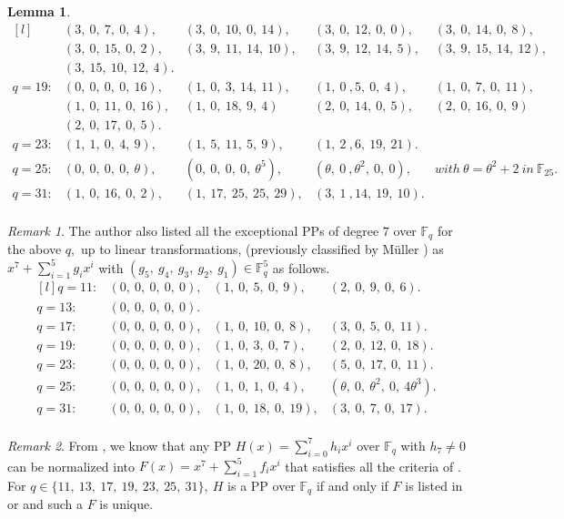 \documentclass[12pt,a4wide, reqno]{amsart}
\newtheorem{lemma}{Lemma}
\theoremstyle{definition}
\theoremstyle{remark}
\newtheorem{remark}{Remark}
\numberwithin{equation}{section}
\begin{document}
\begin{lemma}
\begin{displaymath}
\begin{matrix*}[l]
& (3,~0,~7,~0,~4), &(3,~0,~10,~0,~14),& (3,~0,~12,~0,~0), &(3,~0,~14,~0,~8),\\
& (3,~0,~15,~0,~2), &(3,~9,~11,~14,~10), & (3,~9,~12,~14,~5),& (3,~9,~15,~14,~12),\\
&(3,~15,~10,~12,~4).&  &  & \\
q=19:& (0,~0,~0,~0,~16), &(1,~0,~3,~14,~11), & (1,~0~,5,~0,~4),&(1,~0,~7,~0,~11),\\
& (1,~0,~11,~0,~16),& (1,~0,~18,~9,~4) &(2,~0,~14,~0,~5),  &(2,~0,~16,~0,~9)\\
& (2,~0,~17,~0,~5). & & & \\
q=23:& (1,~1,~0,~4,~9), &(1,~5,~11,~5,~9), & (1,~2~,6,~19,~21).&  \\
q=25:& (0,~0,~0,~0,~\theta), &(0,~0,~0,~0,~\theta^5), & (\theta,~0~,\theta^2,~0,~0),& with~\theta=\theta^2+2~in~ \mathbb{F}_{25}.  \\
q=31:& (1,~0,~16,~0,~2), &(1,~17,~25,~25,~29), & (3,~1~,14,~19,~10).&   \\ 
\end{matrix*}
\end{displaymath}
\end{lemma}
\begin{remark} \label{r1}
    The author also listed  all the exceptional PPs of degree $7$ over $\mathbb{F}_q$ for the above $q,$ up to linear transformations, (previously classified by M\"{u}ller \cite[Theorem~4]{muller}) as $x^7+\sum_{i=1}^{5}g_ix^i$ with $(g_5,~g_4,~g_3,~g_2,~g_1)\in \mathbb{F}_q^5$ as follows.
    \begin{displaymath}
        \begin{matrix*}[l]
        q=11:&(0,~0,~0,~0,~0),& (1,~0,~5,~0,~9), & (2,~0,~9,~0,~6).\\
        q=13:&(0,~0,~0,~0,~0).&  & \\
        q=17:&(0,~0,~0,~0,~0),& (1,~0,~10,~0,~8), & (3,~0,~5,~0,~11).\\
        q=19:&(0,~0,~0,~0,~0),& (1,~0,~3,~0,~7), & (2,~0,~12,~0,~18).\\
        q=23:&(0,~0,~0,~0,~0),& (1,~0,~20,~0,~8), & (5,~0,~17,~0,~11).\\
         q=25:&(0,~0,~0,~0,~0),& (1,~0,~1,~0,~4), & (\theta,~0,~\theta^2,~0,~4\theta^3).\\
        q=31:&(0,~0,~0,~0,~0),& (1,~0,~18,~0,~19), & (3,~0,~7,~0,~17).\\
       
        \end{matrix*}
    \end{displaymath}
\end{remark}
\begin{remark}\label{r2}
From , we know that any PP $H(x)=\sum_{i=0}^{7}h_ix^i$ over $\mathbb{F}_q$ with $h_7\neq 0$ can be normalized into $F(x)=x^7+\sum_{i=1}^{5}f_ix^i$ that satisfies all the criteria of . For $q\in \{11,~13,~17,~19,~23,~25,~31\},~H$ is a PP over $\mathbb{F}_q$ if and only if $F$ is listed in  or  and such a $F$ is unique.
\end{remark}
\end{document}
